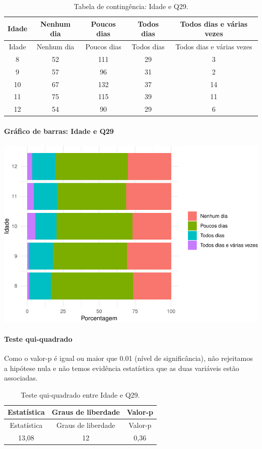 \documentclass[]{article}
\let\oldparagraph\paragraph
\renewcommand{\paragraph}[1]{\oldparagraph{#1}\mbox{}}
\begin{document}
\begin{longtable}[]{@{}ccccc@{}}
\caption{\label{tab:unnamed-chunk-917}Tabela de contingência: Idade e Q29.}\tabularnewline
\toprule
Idade & Nenhum dia & Poucos dias & Todos dias & Todos dias e várias vezes\tabularnewline
\midrule
\endfirsthead
\toprule
Idade & Nenhum dia & Poucos dias & Todos dias & Todos dias e várias vezes\tabularnewline
\midrule
\endhead
8 & 52 & 111 & 29 & 3\tabularnewline
9 & 57 & 96 & 31 & 2\tabularnewline
10 & 67 & 132 & 37 & 14\tabularnewline
11 & 75 & 115 & 39 & 11\tabularnewline
12 & 54 & 90 & 29 & 6\tabularnewline
\bottomrule
\end{longtable}

\hypertarget{gruxe1fico-de-barras-idade-e-q29}{%
\paragraph{Gráfico de barras: Idade e Q29}\label{gruxe1fico-de-barras-idade-e-q29}}

\begin{center}\includegraphics[width=0.75\linewidth]{relatorio_covid19_files/figure-latex/unnamed-chunk-918-1} \end{center}

\hypertarget{teste-qui-quadrado-79}{%
\paragraph{Teste qui-quadrado}\label{teste-qui-quadrado-79}}

Como o valor-p é igual ou maior que 0.01 (nível de significância), não rejeitamos a hipótese nula e não temos evidência estatística que as duas variáveis estão associadas.

\begin{longtable}[]{@{}ccc@{}}
\caption{\label{tab:unnamed-chunk-920}Teste qui-quadrado entre Idade e Q29.}\tabularnewline
\toprule
Estatística & Graus de liberdade & Valor-p\tabularnewline
\midrule
\endfirsthead
\toprule
Estatística & Graus de liberdade & Valor-p\tabularnewline
\midrule
\endhead
13,08 & 12 & 0,36\tabularnewline
\bottomrule
\end{longtable}
\end{document}
